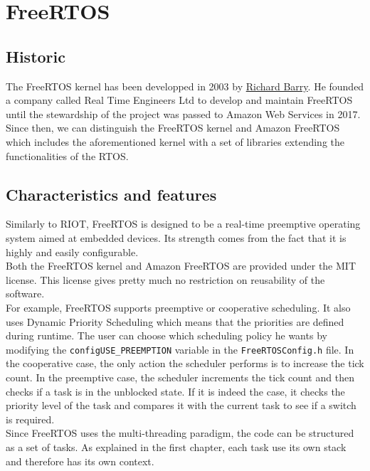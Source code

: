 \section{FreeRTOS}

\subsection{Historic}
The FreeRTOS kernel has been developped in 2003 by \href{https://www.linkedin.com/in/richard-barry-4562262/}{Richard Barry}. %
He founded a company called Real Time Engineers Ltd to develop and maintain FreeRTOS until the stewardship of the project was passed to Amazon Web Services in 2017.
Since then, we can distinguish the FreeRTOS kernel and Amazon FreeRTOS which includes the aforementioned kernel 
    with a set of libraries extending the functionalities of the RTOS.

\subsection{Characteristics and features}
Similarly to RIOT, FreeRTOS is designed to be a real-time preemptive operating system aimed at embedded devices.
Its strength comes from the fact that it is highly and easily configurable.\\

Both the FreeRTOS kernel and Amazon FreeRTOS are provided under the MIT license.
This license gives pretty much no restriction on reusability of the software.\\

For example, FreeRTOS supports preemptive or cooperative scheduling. 
It also uses Dynamic Priority Scheduling which means that the priorities are defined during runtime.
The user can choose which scheduling policy he wants by modifying the \texttt{configUSE\_PREEMPTION} variable in the \texttt{FreeRTOSConfig.h} file.
In the cooperative case, the only action the scheduler performs is to increase the tick count.
In the preemptive case, the scheduler increments the tick count and then checks if a task is in the unblocked state.
If it is indeed the case, it checks the priority level of the task and compares it with the current task to see if a switch is required.\\

Since FreeRTOS uses the multi-threading paradigm, the code can be structured as a set of tasks.
As explained in the first chapter, each task use its own stack and therefore has its own context.

